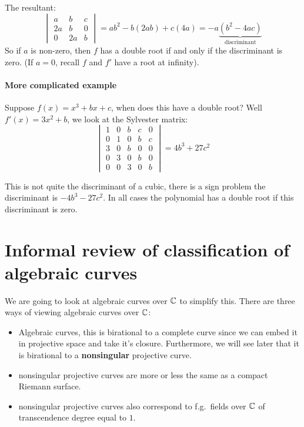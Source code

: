 The resultant:\[\begin{vmatrix*}
    a & b & c\\
    2a & b & 0\\
    0 & 2a & b
\end{vmatrix*} = ab^2 -b(2ab)+c(4a) = -a\underbrace{(b^2-4ac)}_{\text{discriminant}} \]
So if $a$ is non-zero, then $f$ has a double root if and only if the discriminant is zero. (If $a=0$, recall $f$ and $f'$ have a root at infinity).

\paragraph*{More complicated example}
Suppose $f(x) = x^3+bx+c$, when does this have a double root? Well $f'(x) = 3x^2+b$, we look at the Sylvester matrix:\[
\begin{vmatrix*}
    1 & 0 & b & c & 0\\
    0 & 1 & 0 & b & c\\
    3 & 0 & b & 0 & 0\\
    0 & 3 & 0 & b & 0\\
    0 & 0 & 3 & 0 & b
\end{vmatrix*} = 4b^3+27c^2
\]

This is not quite the discriminant of a cubic, there is a sign problem the discriminant is $-4b^3-27c^2$. In all cases the polynomial has a double root if this discriminant is zero.


\section{Informal review of classification of algebraic curves}
We are going to look at algebraic curves over $\mathbb{C}$ to simplify this. There are three ways of viewing algebraic curves over $\mathbb{C}$:\begin{itemize}
    \item Algebraic curves, this is birational to a complete curve since we can embed it in projective space and take it's closure. Furthermore, we will see later that it is birational to a \textbf{nonsingular} projective curve.
    \item nonsingular projective curves are more or less the same as a compact Riemann surface.
    \item nonsingular projective curves also correspond to f.g.\ fields over $\mathbb{C}$ of transcendence degree equal to $1$.
\end{itemize}


